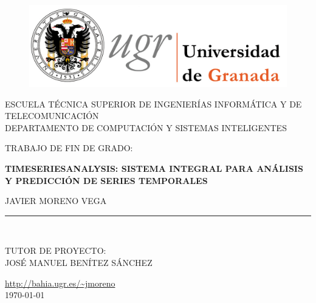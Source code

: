 \documentclass[14pt]{extarticle}
\theoremstyle{definition}
\theoremstyle{remark}
\begin{document}
\begin{titlepage}

\begin{center}
\vspace*{-1in}
\begin{figure}[htb]
\begin{center}
\includegraphics[scale=0.3]{ugr.png}
\end{center}
\end{figure}
ESCUELA TÉCNICA SUPERIOR DE INGENIERÍAS INFORMÁTICA Y DE TELECOMUNICACIÓN\\
\vspace*{0.15in}
DEPARTAMENTO DE COMPUTACIÓN Y SISTEMAS INTELIGENTES \\
\vspace*{0.6in}
\begin{large}
TRABAJO DE FIN DE GRADO:\\
\end{large}
\vspace*{0.2in}
\begin{Large}
\textbf{TIMESERIESANALYSIS: SISTEMA INTEGRAL PARA ANÁLISIS Y PREDICCIÓN DE SERIES TEMPORALES} \\
\end{Large}
\vspace*{0.3in}
\begin{large}
JAVIER MORENO VEGA\\
\end{large}
\vspace*{0.3in}
\rule{80mm}{0.1mm}\\
\vspace*{0.1in}
\begin{large}
TUTOR DE PROYECTO: \\
JOSÉ MANUEL BENÍTEZ SÁNCHEZ \\
\end{large}
\vspace*{2in}
\url{http://bahia.ugr.es/~jmoreno}
\vspace*{0.2in}\\
\today
\end{center}
\end{titlepage}
\newpage
\tableofcontents %
\cleardoublepage
\end{document}
